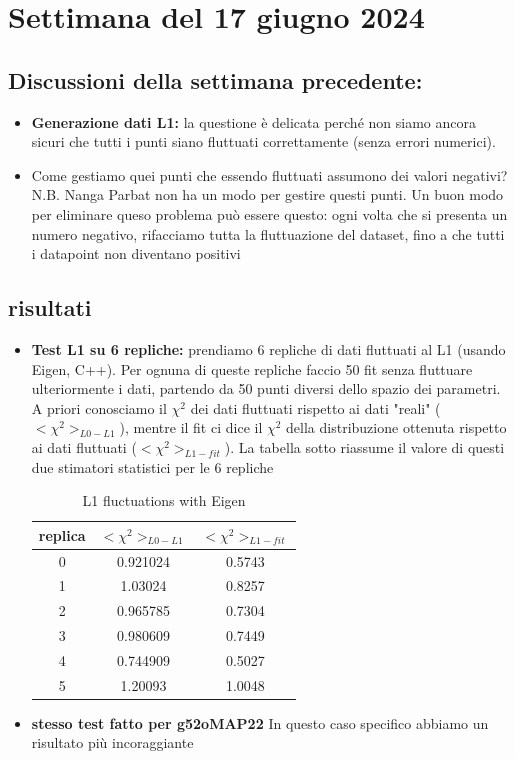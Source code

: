 \documentclass{article}
\begin{document}
\section{Settimana del 17 giugno 2024}
\subsection{Discussioni della settimana precedente:}
\begin{itemize}
    \item \textbf{Generazione dati L1: } la questione è delicata perché non siamo ancora sicuri che tutti i punti siano fluttuati correttamente (senza errori numerici).
    
    \item Come gestiamo quei punti che essendo fluttuati assumono dei valori negativi? N.B. Nanga Parbat non ha un modo per gestire questi punti. Un buon modo per eliminare queso problema può essere questo: ogni volta che si presenta un numero negativo, rifacciamo tutta la fluttuazione del dataset, fino a che tutti i datapoint non diventano positivi
\end{itemize}
\subsection{risultati}
\begin{itemize}
    \item \textbf{Test L1 su 6 repliche: } prendiamo 6 repliche di dati fluttuati al L1 (usando Eigen, C++). Per ognuna di queste repliche faccio 50 fit senza fluttuare ulteriormente i dati, partendo da 50 punti diversi dello spazio dei parametri. A priori conosciamo il $\chi^2$ dei dati fluttuati rispetto ai dati "reali" ($<\chi^2>_{L0-L1}$), mentre il fit ci dice il $\chi^2$  della distribuzione ottenuta rispetto ai dati fluttuati ($<\chi^2>_{L1-fit}$). La tabella sotto riassume il valore di questi due stimatori statistici per le 6 repliche

    
    \begin{table}[h]
    \caption{L1 fluctuations with Eigen}
    \label{tab:L0_results}
    \centering
    \begin{adjustbox}{width=\textwidth}
        \begin{tabular}{|c|c|c|}
        \hline
        \textbf{replica} & \textbf{$<\chi^2>_{L0-L1}$} & \textbf{$<\chi^2>_{L1-fit}$} \\
        \hline
         0 & 0.921024 & 0.5743  \\
         1 & 1.03024 & 0.8257 \\
         2 & 0.965785 & 0.7304 \\
         3 & 0.980609 & 0.7449 \\
         4 & 0.744909  & 0.5027 \\
         5 & 1.20093 & 1.0048 \\
        \hline
    \end{tabular}
\end{adjustbox}
\end{table}
\item \textbf{stesso test fatto per g52oMAP22} In questo caso specifico abbiamo un risultato più incoraggiante 
\end{itemize}
\end{document}
